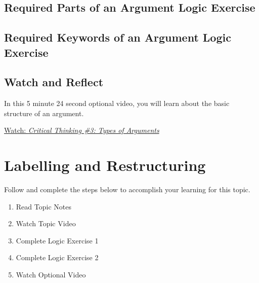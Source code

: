 \documentclass[
]{book}
\providecommand{\tightlist}{%
  \setlength{\itemsep}{0pt}\setlength{\parskip}{0pt}}
\begin{document}
\hypertarget{required-parts-of-an-argument-logic-exercise}{%
\subsection*{Required Parts of an Argument Logic Exercise}\label{required-parts-of-an-argument-logic-exercise}}

\begin{reflect}
\end{reflect}

\hypertarget{required-keywords-of-an-argument-logic-exercise}{%
\subsection*{Required Keywords of an Argument Logic Exercise}\label{required-keywords-of-an-argument-logic-exercise}}

\begin{reflect}
\end{reflect}

\hypertarget{watch-and-reflect-15}{%
\subsection*{Watch and Reflect}\label{watch-and-reflect-15}}

\begin{reflect}
In this 5 minute 24 second optional video, you will learn about the basic structure of an argument.

\href{https://www.youtube.com/watch?v=wbRxR53F3rI}{Watch: \emph{Critical Thinking \#3: Types of Arguments}}
\end{reflect}

\hypertarget{labelling-and-restructuring}{%
\section{Labelling and Restructuring}\label{labelling-and-restructuring}}

Follow and complete the steps below to accomplish your learning for this topic.

\begin{enumerate}
\def\labelenumi{\arabic{enumi}.}
\tightlist
\item
  Read Topic Notes\\
\item
  Watch Topic Video\\
\item
  Complete Logic Exercise 1\\
\item
  Complete Logic Exercise 2\\
\item
  Watch Optional Video
\end{enumerate}
\end{document}
